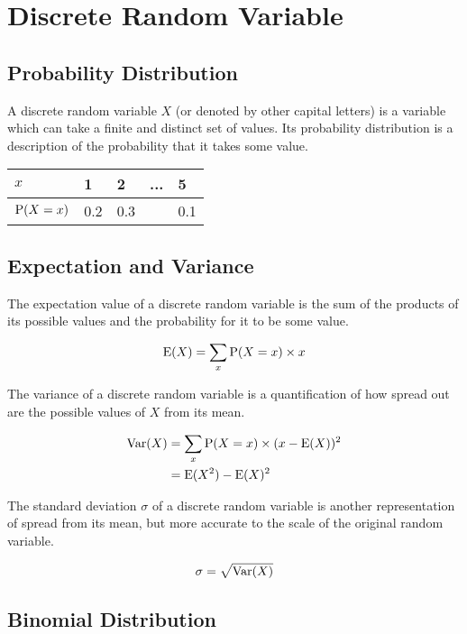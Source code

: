 \documentclass[../main]{subfiles}
\begin{document}
\section{Discrete Random Variable}

	\subsection{Probability Distribution}

	A discrete random variable \(X\) (or denoted by other capital letters) is a variable which can take a finite and distinct set of values. Its probability distribution is a description of the probability that it takes some value. 

	\begin{center}
		\begin{tabular}{|l|l|l|l|l|}
			\hline
			\(x\)        & 1   & 2   & ... & 5   \\ \hline
			\(\operatorname{P}(X = x)\) & 0.2 & 0.3 &     & 0.1 \\ \hline
		\end{tabular}
	\end{center}

	\subsection{Expectation and Variance}

 	The expectation value of a discrete random variable is the sum of the products of its possible values and the probability for it to be some value.

 	\[ \operatorname{E}(X) = \sum_x \operatorname{P}(X=x) \times x\]

 	The variance of a discrete random variable is a quantification of how spread out are the possible values of \(X\) from its mean. 

 	\begin{equation*} \begin{aligned}
		\operatorname{Var}(X) & = \sum_x \operatorname{P}(X=x) \times (x - \operatorname{E}(X))^2 \\
				& = \operatorname{E}(X^2) - \operatorname{E}(X)^2
	\end{aligned} \end{equation*}

	The standard deviation \(\sigma\) of a discrete random variable is another representation of spread from its mean, but more accurate to the scale of the original random variable.

	\[\sigma = \sqrt{\operatorname{Var}(X)}\]

	\subsection{Binomial Distribution}
\end{document}
